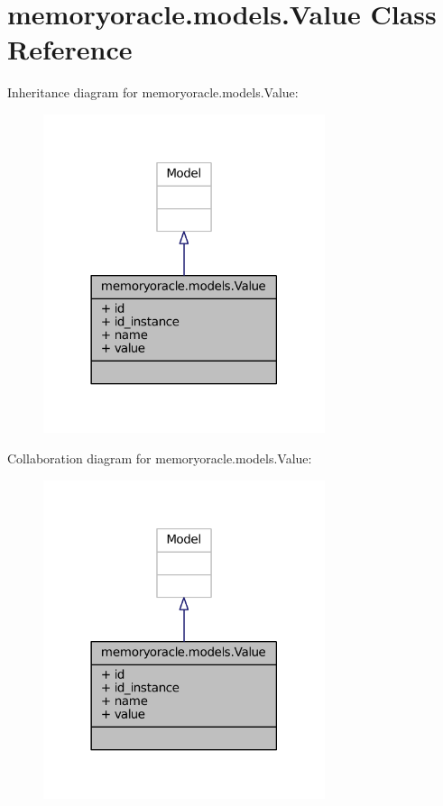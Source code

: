 \hypertarget{classmemoryoracle_1_1models_1_1Value}{}\section{memoryoracle.\+models.\+Value Class Reference}
\label{classmemoryoracle_1_1models_1_1Value}


Inheritance diagram for memoryoracle.\+models.\+Value\+:\nopagebreak
\begin{figure}[H]
\begin{center}
\leavevmode
\includegraphics[width=234pt]{classmemoryoracle_1_1models_1_1Value__inherit__graph}
\end{center}
\end{figure}


Collaboration diagram for memoryoracle.\+models.\+Value\+:\nopagebreak
\begin{figure}[H]
\begin{center}
\leavevmode
\includegraphics[width=234pt]{classmemoryoracle_1_1models_1_1Value__coll__graph}
\end{center}
\end{figure}
